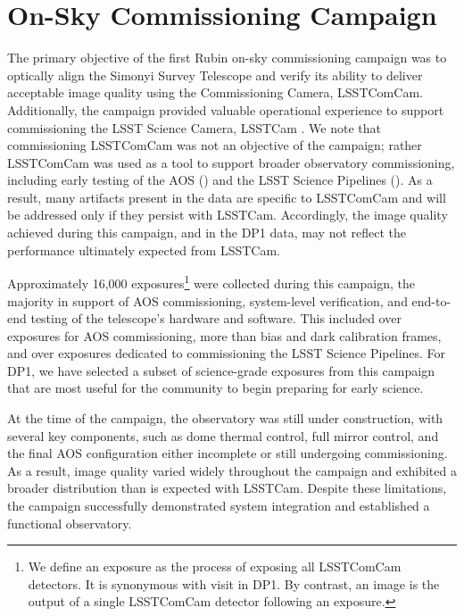 \section{On-Sky Commissioning Campaign}
\label{sec:on_sky_campaign}
%
The primary objective of the first Rubin on-sky commissioning campaign was to optically align the Simonyi Survey Telescope and verify its ability to deliver acceptable image quality using the Commissioning Camera, \gls{LSSTComCam}.
Additionally, the campaign provided valuable operational experience to support commissioning the LSST Science Camera, \gls{LSSTCam} \citep{2024SPIE13096E..1OL,2024SPIE13096E..1SR}.
We note that commissioning \gls{LSSTComCam} was not an objective of the campaign; rather \gls{LSSTComCam} was used as a tool to support broader observatory commissioning, including early testing of the \gls{AOS} () and the LSST Science Pipelines ().
As a result, many artifacts present in the data are specific to \gls{LSSTComCam} and will be addressed only if they persist with \gls{LSSTCam}.
Accordingly, the image quality achieved during this campaign, and in the \gls{DP1} data, may not reflect the performance ultimately expected from \gls{LSSTCam}.

Approximately 16,000 exposures\footnote{We define an exposure as the process of exposing all \gls{LSSTComCam} detectors. It is synonymous with visit in \gls{DP1}. By contrast, an image is the output of a single \gls{LSSTComCam} detector following an exposure.} were collected during this campaign, the majority in support of \gls{AOS} commissioning, system-level verification, and end-to-end testing of the telescope’s hardware and software.
This included over \nexposuresaoscommissioning exposures for \gls{AOS} commissioning, more than \nexposurescalibcommissioning bias and dark calibration frames, and over \nexposuresspcommissioning exposures dedicated to commissioning the LSST Science Pipelines.
For \gls{DP1}, we have selected a subset of \nexposures science-grade exposures from this campaign that are most useful for the community to begin preparing for early science.

At the time of the campaign, the observatory was still under construction, with several key components, such as dome thermal control, full mirror control, and the final \gls{AOS} configuration either incomplete or still undergoing commissioning.
As a result, image quality varied widely throughout the campaign and exhibited a broader distribution than is expected with \gls{LSSTCam}.
Despite these limitations, the campaign successfully demonstrated system integration and established a functional observatory.

